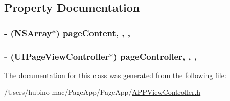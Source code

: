 \subsection{Property Documentation}
\hypertarget{interface_a_p_p_view_controller_ae8a6de2bf7263546c8d7edb133392da6}{
\subsubsection[{page\+Content}]{\setlength{\rightskip}{0pt plus 5cm}-\/ (N\+S\+Array$\ast$) page\+Content\hspace{0.3cm}{\ttfamily [read]}, {\ttfamily [write]}, {\ttfamily [nonatomic]}, {\ttfamily [strong]}}}\label{interface_a_p_p_view_controller_ae8a6de2bf7263546c8d7edb133392da6}
\hypertarget{interface_a_p_p_view_controller_a5ff97842eac6699ffb211f1ea2b93f3a}{
\subsubsection[{page\+Controller}]{\setlength{\rightskip}{0pt plus 5cm}-\/ (U\+I\+Page\+View\+Controller$\ast$) page\+Controller\hspace{0.3cm}{\ttfamily [read]}, {\ttfamily [write]}, {\ttfamily [nonatomic]}, {\ttfamily [strong]}}}\label{interface_a_p_p_view_controller_a5ff97842eac6699ffb211f1ea2b93f3a}


The documentation for this class was generated from the following file\+:\begin{DoxyCompactItemize}
\item 
/\+Users/hubino-\/mac/\+Page\+App/\+Page\+App/\hyperlink{_a_p_p_view_controller_8h}{A\+P\+P\+View\+Controller.\+h}\end{DoxyCompactItemize}
